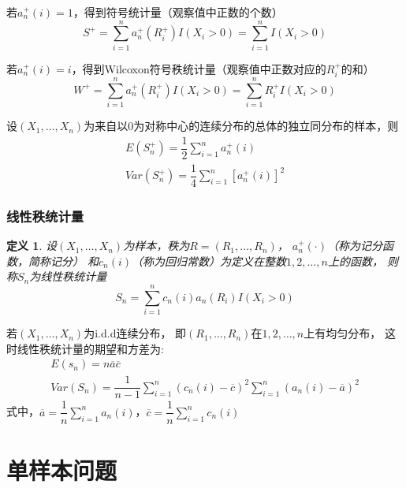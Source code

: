\documentclass[UTF8]{ctexart}
\numberwithin{equation}{section}
\newtheorem{definition}{定义}[section]
\begin{document}
若$a_n^+ (i) = 1$，得到符号统计量（观察值中正数的个数）
\begin{equation}
    S^+ = \sum_{i=1}^n a_n^+ (R_i^+) I(X_i>0) = \sum_{i=1}^n I(X_i>0)
\end{equation}

若$a_n^+ (i) = i$，得到Wilcoxon符号秩统计量（观察值中正数对应的$R_i^+$的和）
\begin{equation}
    W^+ = \sum_{i=1}^n a_n^+ (R_i^+) I(X_i>0) = \sum_{i=1}^n R_i^+ I(X_i>0)
\end{equation}

设$(X_1,\dots,X_n)$为来自以0为对称中心的连续分布的总体的独立同分布的样本，则
\begin{equation}
    \begin{matrix}
        E(S_n^+) = \dfrac{1}{2} \sum_{i=1}^n a_n^+ (i) \\[1em]
        Var(S_n^+) = \dfrac{1}{4}\sum_{i=1}^n [a_n^+ (i)]^2
    \end{matrix}
    \nonumber
\end{equation}

\subsubsection{线性秩统计量}
\begin{definition}
    设$(X_1,\dots,X_n)$为样本，秩为$R=(R_1,\dots,R_n)$，
    $a_n^+ (·)$（称为记分函数，简称记分）
    和$c_n(i)$（称为回归常数）为定义在整数$1,2,\dots,n$上的函数，
    则称$S_n$为线性秩统计量
    \begin{equation}
        S_n = \sum_{i=1}^n c_n(i) a_n (R_i) I(X_i>0)
    \end{equation}
\end{definition}

若$(X_1,\dots,X_n)$为i.d.d连续分布，
即$(R_1,\dots,R_n)$在$1,2,\dots,n$上有均匀分布，
这时线性秩统计量的期望和方差为:
\begin{equation}
    \begin{matrix}
        E(s_n) = n \overline{a} \overline{c} \\[1em]
        Var(S_n)= \dfrac{1}{n-1} \sum_{i=1}^n (c_n (i) - \overline{c})^2 \sum_{i=1}^n (a_n (i) - \overline{a})^2
    \end{matrix}
    \nonumber
\end{equation}
式中，$\overline{a} = \dfrac{1}{n}\sum_{i=1}^n a_n(i)$，$\overline{c} = \dfrac{1}{n}\sum_{i=1}^n c_n(i)$

\clearpage
\section{单样本问题}
\end{document}
